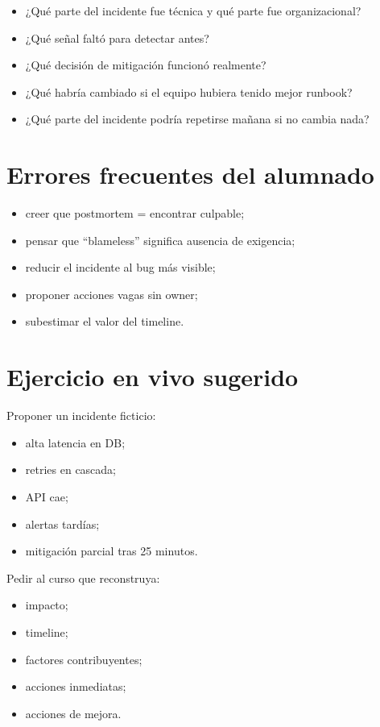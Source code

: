 \documentclass[variant=docente,cover=institutional,mode=screen]{ua-engineering-v6-article}
\begin{document}
\begin{itemize}
\item ¿Qué parte del incidente fue técnica y qué parte fue organizacional?
\item ¿Qué señal faltó para detectar antes?
\item ¿Qué decisión de mitigación funcionó realmente?
\item ¿Qué habría cambiado si el equipo hubiera tenido mejor runbook?
\item ¿Qué parte del incidente podría repetirse mañana si no cambia nada?
\end{itemize}

\section{Errores frecuentes del alumnado}

\begin{itemize}
\item creer que postmortem = encontrar culpable;
\item pensar que “blameless” significa ausencia de exigencia;
\item reducir el incidente al bug más visible;
\item proponer acciones vagas sin owner;
\item subestimar el valor del timeline.
\end{itemize}

\section{Ejercicio en vivo sugerido}

Proponer un incidente ficticio:
\begin{itemize}
\item alta latencia en DB;
\item retries en cascada;
\item API cae;
\item alertas tardías;
\item mitigación parcial tras 25 minutos.
\end{itemize}

Pedir al curso que reconstruya:
\begin{itemize}
\item impacto;
\item timeline;
\item factores contribuyentes;
\item acciones inmediatas;
\item acciones de mejora.
\end{itemize}
\end{document}
